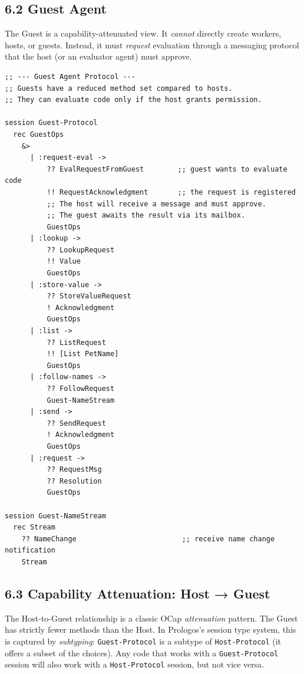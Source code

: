 \documentclass[11pt]{article}
\begin{document}
\subsection{6.2 Guest Agent}
\label{sec:orgda49b2d}

The Guest is a capability-attenuated view. It \emph{cannot} directly create
workers, hosts, or guests. Instead, it must \emph{request} evaluation through
a messaging protocol that the host (or an evaluator agent) must approve.

\begin{verbatim}
;; --- Guest Agent Protocol ---
;; Guests have a reduced method set compared to hosts.
;; They can evaluate code only if the host grants permission.

session Guest-Protocol
  rec GuestOps
    &>
      | :request-eval ->
          ?? EvalRequestFromGuest        ;; guest wants to evaluate code
          !! RequestAcknowledgment       ;; the request is registered
          ;; The host will receive a message and must approve.
          ;; The guest awaits the result via its mailbox.
          GuestOps
      | :lookup ->
          ?? LookupRequest
          !! Value
          GuestOps
      | :store-value ->
          ?? StoreValueRequest
          ! Acknowledgment
          GuestOps
      | :list ->
          ?? ListRequest
          !! [List PetName]
          GuestOps
      | :follow-names ->
          ?? FollowRequest
          Guest-NameStream
      | :send ->
          ?? SendRequest
          ! Acknowledgment
          GuestOps
      | :request ->
          ?? RequestMsg
          ?? Resolution
          GuestOps

session Guest-NameStream
  rec Stream
    ?? NameChange                         ;; receive name change notification
    Stream
\end{verbatim}
\subsection{6.3 Capability Attenuation: Host → Guest}
\label{sec:org903f148}

The Host-to-Guest relationship is a classic OCap \emph{attenuation} pattern. The
Guest has strictly fewer methods than the Host. In Prologos's session type
system, this is captured by \emph{subtyping}: \texttt{Guest-Protocol} is a subtype of
\texttt{Host-Protocol} (it offers a subset of the choices). Any code that works
with a \texttt{Guest-Protocol} session will also work with a \texttt{Host-Protocol}
session, but not vice versa.
\end{document}
